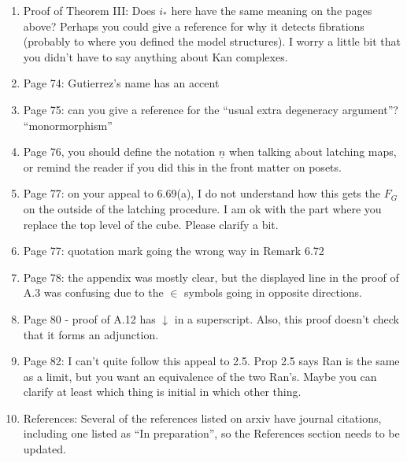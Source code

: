 \documentclass{article}
\begin{document}
\begin{enumerate}
\item
Proof of Theorem III: Does $i_*$ here have the same meaning on the pages above? Perhaps you could give a reference for why it detects fibrations (probably to where you defined the model structures). I worry a little bit that you didn't have to say anything about Kan complexes.

\item
Page 74: Gutierrez's name has an accent

\item
Page 75: can you give a reference for the ``usual extra degeneracy argument''?
``monormorphism''

\item
Page 76, you should define the notation $\underline{n}$ when talking about latching maps, or remind the reader if you did this in the front matter on posets.

\item
Page 77: on your appeal to 6.69(a), I do not understand how this gets the $F_G$ on the outside of the latching procedure. I am ok with the part where you replace the top level of the cube. Please clarify a bit.

\item
Page 77: quotation mark going the wrong way in Remark 6.72

\item
Page 78: the appendix was mostly clear, but the displayed line in the proof of A.3 was confusing due to the $\in$ symbols going in opposite directions.

\item
Page 80 - proof of A.12 has $\downarrow$ in a superscript. Also, this proof doesn't check that it forms an adjunction.

\item
Page 82: I can't quite follow this appeal to 2.5. Prop 2.5 says Ran is the same as a limit, but you want an equivalence of the two Ran's. Maybe you can clarify at least which thing is initial in which other thing. 

\item
References:
Several of the references listed on arxiv have journal citations, including one listed as ``In preparation'', so the References section needs to be updated.



\end{enumerate}







{}


\end{document}
